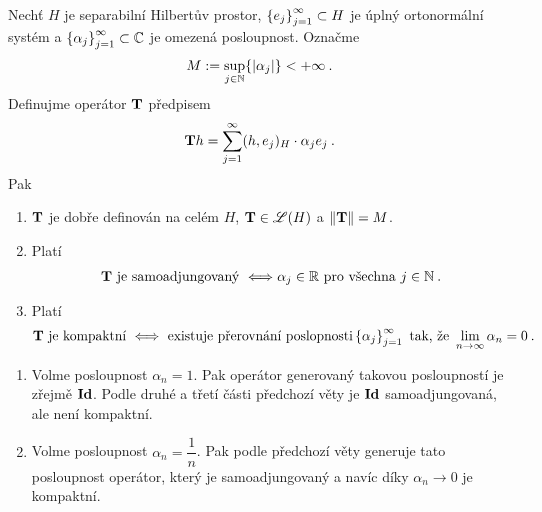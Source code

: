 \begin{theorem} \label{4.rozklad II}
Nechť $H$ je separabilní Hilbertův prostor, $\left \lbrace e_j \right \rbrace_{j=1}^\infty \subset H$ je úplný ortonormální systém a $\left \lbrace \alpha_j \right \rbrace_{j=1}^\infty \subset \mathbb{C}$ je omezená posloupnost. Označme \begin{align*}
    M:= \sup_{j \in \mathbb{N}} \{ |\alpha_j|\} < + \infty \:.
\end{align*}
Definujme operátor $\mathbf{T}$ předpisem \begin{align*}
    \mathbf{T} h = \sum_{j=1}^\infty (h, e_j)_H \cdot \alpha_j  e_j \:.
\end{align*}
Pak \begin{enumerate}
    \item  $\mathbf{T}$ je dobře definován na celém $H$, $\mathbf{T} \in \mathscr{L} (H)$ a $\left\lVert\mathbf{T}\right\rVert = M$.
    \item Platí\begin{align*}
        \mathbf{T} \text{ je samoadjungovaný } \Longleftrightarrow \alpha_j \in \mathbb{R} \text{ pro všechna } j \in \mathbb{N} \:. 
    \end{align*}
    \item Platí \begin{align*}
        \mathbf{T} \text{ je kompaktní } \Longleftrightarrow \text{ existuje přerovnání poslopnosti} \left \lbrace \alpha_j \right \rbrace_{j=1}^\infty \text{ tak, že } \lim_{n \rightarrow \infty} \alpha_n = 0 \:.
    \end{align*}
\end{enumerate}
\end{theorem}

\begin{example}
\begin{enumerate}
    \item Volme posloupnost $\alpha_n=1$. Pak operátor generovaný takovou posloupností je zřejmě $\mathbf{Id}$. Podle druhé a třetí části předchozí věty je $\mathbf{Id}$ samoadjungovaná, ale není kompaktní.
    \item Volme posloupnost $\alpha_n = \dfrac{1}{n}$. Pak podle předchozí věty generuje tato posloupnost operátor, který je samoadjungovaný a navíc díky $\alpha_n \rightarrow 0$ je kompaktní.
\end{enumerate}
\end{example}

